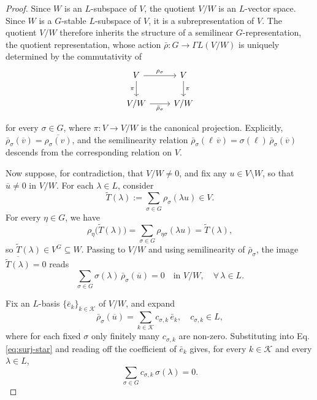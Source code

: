 \documentclass[hidelinks,onefignum,onetabnum]{siamart251216}
\theoremstyle{definition}
\theoremstyle{remark}
\begin{document}
\begin{proof}
Since $W$ is an $L$-subspace of $V$, the quotient $V/W$ is an
$L$-vector space. Since $W$ is a $G$-stable $L$-subspace of $V$, it is a subrepresentation
of $V$. The quotient $V/W$ therefore inherits the structure of a
semilinear $G$-representation, the quotient representation,
whose action $\bar\rho\colon G\to \Gamma L(V/W)$ is uniquely determined
by the commutativity of
\[
\begin{tikzcd}
	V \arrow[r, "\rho_{\sigma}"] \arrow[d, "\pi"'] & V \arrow[d, "\pi"] \\
	V/W \arrow[r, "\bar\rho_{\sigma}"'] & V/W
\end{tikzcd}
\]

for every $\sigma\in G$, where $\pi\colon V\to V/W$ is the canonical
projection. Explicitly, $\bar\rho_{\sigma}(\overline{v})
=\overline{\rho_{\sigma}(v)}$, and the semilinearity relation
$\bar\rho_{\sigma}(\ell\,\overline{v})=\sigma(\ell)\,
\bar\rho_{\sigma}(\overline{v})$ descends from the corresponding
relation on $V$.

Now suppose, for contradiction, that $V/W\neq 0$, and fix any
$u\in V\setminus W$, so that $\overline{u}\neq 0$ in $V/W$. For each
$\lambda\in L$, consider
\[
\widetilde{T}(\lambda):=\sum_{\sigma\in G}\rho_{\sigma}(\lambda u)
\in V.
\]
For every $\eta\in G$, we have
\[
\rho_{\eta}\bigl(\widetilde{T}(\lambda)\bigr)
=\sum_{\sigma\in G}\rho_{\eta\sigma}(\lambda u)
=\widetilde{T}(\lambda),
\]
so $\widetilde{T}(\lambda)\in V^{G}\subseteq W$. Passing to $V/W$ and
using semilinearity of $\bar\rho_{\sigma}$, the image
$\overline{\widetilde{T}(\lambda)}=0$ reads
\begin{equation}\label{eq:surj-star}
	\sum_{\sigma\in G}\sigma(\lambda)\,\bar\rho_{\sigma}(\overline{u})=0
	\quad\text{in } V/W, \quad \forall\,\lambda\in L.
\end{equation}

Fix an $L$-basis $\{\bar e_{k}\}_{k\in\mathcal K}$ of $V/W$, and
expand
\[
\bar\rho_{\sigma}(\overline{u})=\sum_{k\in\mathcal K}c_{\sigma,k}\,
\bar e_{k}, \quad c_{\sigma,k}\in L,
\]
where for each fixed $\sigma$ only finitely many $c_{\sigma,k}$ are
non-zero. Substituting into Eq. \eqref{eq:surj-star} and reading off the
coefficient of $\bar e_{k}$ gives, for every $k\in\mathcal K$ and
every $\lambda\in L$,
\begin{equation}\label{eq:surj-char}
	\sum_{\sigma\in G}c_{\sigma,k}\,\sigma(\lambda)=0.
\end{equation}


\end{proof}
\end{document}
